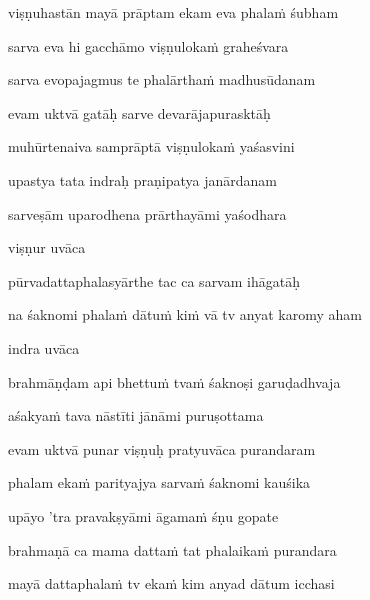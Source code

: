 viṣṇuhastān mayā prāptam ekam eva phala\.m śubham \veg\dontdisplaylinenum

sarva eva hi gacchāmo viṣṇuloka\.m graheśvara\thinspace{\dandab} \dontdisplaylinenum

sarva evopajagmus te phalārtha\.m madhusūdanam \veg\dontdisplaylinenum

evam uktvā gatāḥ sarve devarājapurasktāḥ\thinspace{\dandab} \dontdisplaylinenum

muhūrtenaiva samprāptā viṣṇuloka\.m yaśasvini \veg\dontdisplaylinenum

upastya tata indraḥ praṇipatya janārdanam\thinspace{\dandab} \dontdisplaylinenum

sarveṣām uparodhena prārthayāmi yaśodhara \veg\dontdisplaylinenum

viṣṇur uvāca~{\dandab}\dontdisplaylinenum 

pūrvadattaphalasyārthe tac ca sarvam ihāgatāḥ\thinspace{\danda} \dontdisplaylinenum

na śaknomi phala\.m dātu\.m ki\.m vā tv anyat karomy aham \veg\dontdisplaylinenum

indra uvāca~{\dandab}\dontdisplaylinenum 

brahmāṇḍam api bhettu\.m tva\.m śaknoṣi garuḍadhvaja\thinspace{\danda} \dontdisplaylinenum

aśakya\.m tava nāstīti jānāmi puruṣottama \veg\dontdisplaylinenum

evam uktvā punar viṣṇuḥ pratyuvāca purandaram\thinspace{\dandab} \dontdisplaylinenum

phalam eka\.m parityajya sarva\.m śaknomi kauśika \veg\dontdisplaylinenum

upāyo 'tra pravakṣyāmi āgama\.m śṇu gopate\thinspace{\dandab} \dontdisplaylinenum

brahmaṇā ca mama datta\.m tat phalaika\.m purandara \veg\dontdisplaylinenum

mayā dattaphala\.m tv eka\.m kim anyad dātum icchasi\thinspace{\dandab} \dontdisplaylinenum

